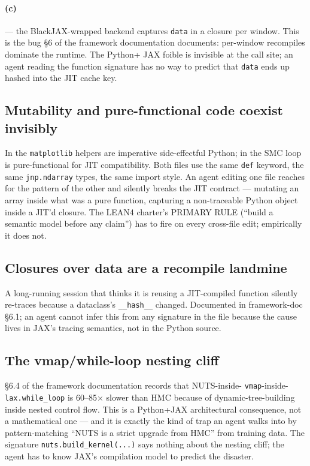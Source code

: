 \documentclass[11pt,a4paper]{article}
\begin{document}
\paragraph{(c)}  --- the
BlackJAX-wrapped backend captures \texttt{data} in a closure per
window. This is the bug §6 of the framework documentation
documents: per-window recompiles dominate the runtime. The Python+
JAX foible is invisible at the call site; an agent reading the
function signature has no way to predict that \texttt{data} ends up
hashed into the JIT cache key.

\subsection{Mutability and pure-functional code coexist invisibly}

In  the \texttt{matplotlib}
helpers are imperative side-effectful Python; in
 the SMC loop is
pure-functional for JIT compatibility. Both files use the same
\texttt{def} keyword, the same \texttt{jnp.ndarray} types, the same
import style. An agent editing one file reaches for the pattern of
the other and silently breaks the JIT contract --- mutating an
array inside what was a pure function, capturing a non-traceable
Python object inside a JIT'd closure. The LEAN4 charter's PRIMARY
RULE (``build a semantic model before any claim'') has to fire on
every cross-file edit; empirically it does not.

\subsection{Closures over data are a recompile landmine}

A long-running session that thinks it is reusing a JIT-compiled
function silently re-traces because a dataclass's \texttt{\_\_hash\_\_}
changed. Documented in framework-doc §6.1; an agent cannot infer
this from any signature in the file because the cause lives in
JAX's tracing semantics, not in the Python source.

\subsection{The vmap/while-loop nesting cliff}
\label{sec:storm-vmap}

§6.4 of the framework documentation records that NUTS-inside-
\texttt{vmap}-inside-\texttt{lax.while\_loop} is 60--85$\times$
slower than HMC because of dynamic-tree-building inside nested
control flow. This is a Python+JAX architectural consequence, not a
mathematical one --- and it is exactly the kind of trap an agent
walks into by pattern-matching ``NUTS is a strict upgrade from HMC''
from training data. The signature
\verb|nuts.build_kernel(...)| says nothing about the nesting cliff;
the agent has to know JAX's compilation model to predict the
disaster.
\end{document}
